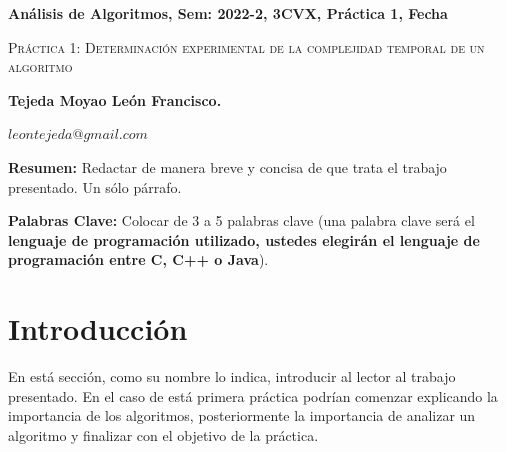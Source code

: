 \documentclass[12pt,twoside]{article}
\date{}
\begin{document}
\begin{figure}[h]
\vspace{-3cm} \hspace{-2cm} \setlength{\unitlength}{1mm}

\end{figure}


\vspace{0cm}

\centerline{\bf An\'alisis de Algoritmos, Sem: 2022-2, 3CVX, Pr\'actica 1, Fecha}

\centerline{}



\begin{center}
\Large{\textsc{Pr\'actica 1: Determinaci\'on experimental de la complejidad temporal de un algoritmo}}
\end{center}
\centerline{}
\centerline{\bf {Tejeda Moyao Le\'on Francisco.}}
\centerline{}
\centerline{$leontejeda@gmail.com$}



\newtheorem{Theorem}{\quad Theorem}[section]

\newtheorem{Definition}[Theorem]{\quad Definition}

\newtheorem{Corollary}[Theorem]{\quad Corollary}

\newtheorem{Lemma}[Theorem]{\quad Lemma}

\newtheorem{Example}[Theorem]{\quad Example}

\bigskip

\textbf{Resumen:} Redactar de manera breve y concisa de que trata el trabajo presentado. Un s\'olo p\'arrafo.





{\bf Palabras Clave:} Colocar de 3 a 5 palabras clave (una palabra clave ser\'a el \textbf{lenguaje de programaci\'on utilizado, ustedes elegir\'an el lenguaje de programaci\'on entre C, C++ o Java}).

\section{Introducci\'on}
En est\'a secci\'on, como su nombre lo indica, introducir al lector al trabajo presentado. En el caso de est\'a primera pr\'actica podr\'ian comenzar explicando la importancia de los algoritmos, posteriormente la importancia de analizar un algoritmo y finalizar con el objetivo de la pr\'actica.
\end{document}
